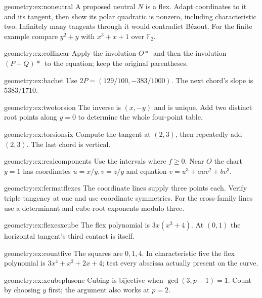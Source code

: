 \begin{hint}{geometry:ex:noneutral}
A proposed neutral $N$ is a flex. Adapt coordinates to it and its tangent, then show its polar quadratic is nonzero, including characteristic two. Infinitely many tangents through it would contradict B\'ezout. For the finite example compare $y^2+y$ with $x^3+x+1$ over $\mathbb F_2$.
\end{hint}
\begin{hint}{geometry:ex:collinear}
Apply the involution $O*\,$ and then the involution $(P+Q)*\,$ to the equation; keep the original parentheses.
\end{hint}
\begin{hint}{geometry:ex:bachet}
Use $2P=(129/100,-383/1000)$. The next chord's slope is $5383/1710$.
\end{hint}
\begin{hint}{geometry:ex:twotorsion}
The inverse is $(x,-y)$ and is unique. Add two distinct root points along $y=0$ to determine the whole four-point table.
\end{hint}
\begin{hint}{geometry:ex:torsionsix}
Compute the tangent at $(2,3)$, then repeatedly add $(2,3)$. The last chord is vertical.
\end{hint}
\begin{hint}{geometry:ex:realcomponents}
Use the intervals where $f\ge0$. Near $O$ the chart $y=1$ has coordinates $u=x/y,v=z/y$ and equation $v=u^3+auv^2+bv^3$.
\end{hint}
\begin{hint}{geometry:ex:fermatflexes}
The coordinate lines supply three points each. Verify triple tangency at one and use coordinate symmetries. For the cross-family lines use a determinant and cube-root exponents modulo three.
\end{hint}
\begin{hint}{geometry:ex:flexesxcube}
The flex polynomial is $3x(x^3+4)$. At $(0,1)$ the horizontal tangent's third contact is itself.
\end{hint}
\begin{hint}{geometry:ex:countfive}
The squares are $0,1,4$. In characteristic five the flex polynomial is $3x^4+x^2+2x+4$; test every abscissa actually present on the curve.
\end{hint}
\begin{hint}{geometry:ex:xcubeplusone}
Cubing is bijective when $\gcd(3,p-1)=1$. Count by choosing $y$ first; the argument also works at $p=2$.
\end{hint}
